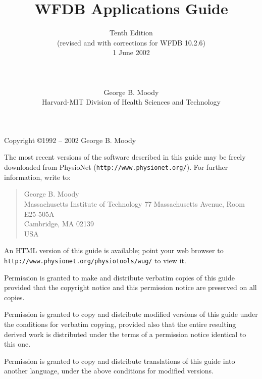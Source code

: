 \documentclass[twoside]{book}
\title{WFDB Applications Guide}
\author{Tenth Edition\\
(revised and with corrections for WFDB 10.2.6)\\
1 June 2002\\
\\
\\
\\
George B. Moody\\
Harvard-MIT Division of Health Sciences and Technology}
\date{}
\begin{document}
\maketitle

\pagestyle{empty}
\vspace*{\fill}
\noindent
Copyright \copyright 1992 -- 2002 George B. Moody

\vspace{1 in}
\noindent
The most recent versions of the software described in this guide may be
freely downloaded from PhysioNet ({\tt http://www.physionet.org/}).
For further information, write to:

\begin{quote}
George B. Moody\\
Massachusetts Institute of Technology
77 Massachusetts Avenue, Room E25-505A\\
Cambridge, MA 02139\\
USA\\
\end{quote}

\noindent
An HTML version of this guide is available; point your web browser to
{\tt http://www.\-physio\-net.\-org/\-physio\-tools/\-wug/} to view it.

\vspace{0.2 in}
\noindent
Permission is granted to make and distribute verbatim copies of this
guide provided that the copyright notice and this permission notice are
preserved on all copies.

\vspace{0.2 in}
\noindent
Permission is granted to copy and distribute modified versions of this
guide under the conditions for verbatim copying, provided also that the
entire resulting derived work is distributed under the terms of a
permission notice identical to this one.

\vspace{0.2 in}
\noindent
Permission is granted to copy and distribute translations of this guide
into another language, under the above conditions for modified versions.
\end{document}
